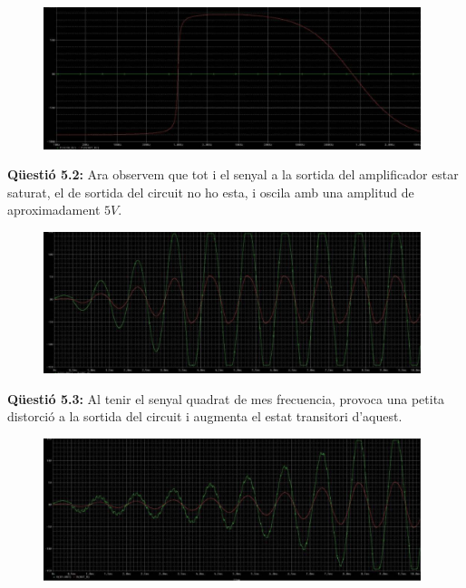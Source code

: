 \documentclass[12pt, a4papre]{article}
\begin{document}
	\begin{figure}[H]
		\begin{center}
		\includegraphics[width=110mm]{5_1_2.png}
		\end{center}
	\end{figure}
	
	\textbf{Qüestió 5.2:} Ara observem que tot i el senyal a la sortida del amplificador estar saturat, el de sortida del circuit no ho esta, i oscila amb una amplitud de aproximadament $5V$.
	
	\begin{figure}[H]
		\begin{center}
		\includegraphics[width=110mm]{5_2.png}
		\end{center}
	\end{figure}
	
	\textbf{Qüestió 5.3:} Al tenir el senyal quadrat de mes frecuencia, provoca una petita distorció a la sortida del circuit i augmenta el estat transitori d'aquest.
	
	\begin{figure}[H]
		\begin{center}
		\includegraphics[width=110mm]{5_3_1.png}
		\end{center}
	\end{figure}
	
\end{document}
